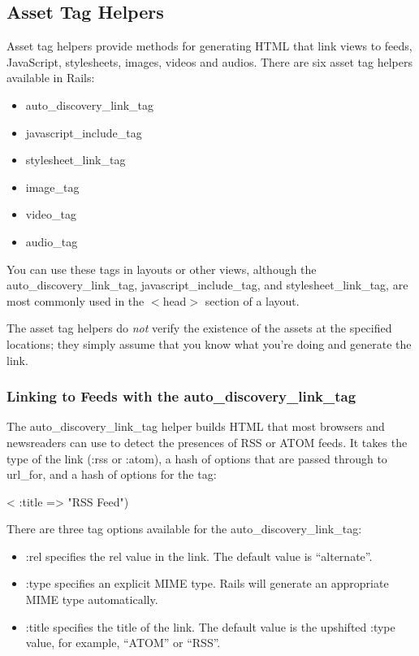 \documentclass[10pt]{book}
\newenvironment{code}{%
  \scriptsize
    \verbatim
}{%
    \endverbatim
    \newline
}
\begin{document}
\subsection{ Asset Tag Helpers}

Asset tag helpers provide methods for generating HTML  that link views to feeds, JavaScript, stylesheets, images, videos and  audios. There are six asset tag helpers available in Rails:
\begin{itemize}
	\item auto\_discovery\_link\_tag
	\item javascript\_include\_tag
	\item stylesheet\_link\_tag
	\item image\_tag
	\item video\_tag
	\item audio\_tag
\end{itemize}

You can use these tags in layouts or other views, although the auto\_discovery\_link\_tag, javascript\_include\_tag, and stylesheet\_link\_tag, are most commonly used in the $<$head$>$ section of a layout.

The asset tag helpers do \emph{not} verify the  existence of the assets at the specified locations; they simply assume  that you know what you’re doing and generate the link.

\subsubsection{ Linking to Feeds with the auto\_discovery\_link\_tag}

The auto\_discovery\_link\_tag helper builds HTML that most browsers and newsreaders can use to detect the presences of RSS or ATOM feeds. It takes the type of the link (:rss or :atom), a hash of options that are passed through to url\_for, and a hash of options for the tag:
\begin{code}
<%
  {:title => "RSS Feed"}) %
\end{code}

There are three tag options available for the auto\_discovery\_link\_tag:
\begin{itemize}
	\item :rel specifies the rel value in the link. The default value is “alternate”.
	\item :type specifies an explicit MIME type. Rails will generate an appropriate MIME type automatically.
	\item :title specifies the title of the link. The default value is the upshifted :type value, for example, “ATOM” or “RSS”.
\end{itemize}
\end{document}
